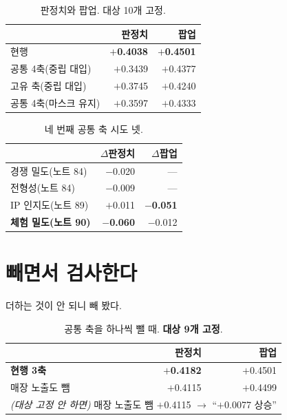 \documentclass[10pt]{article}
\begin{document}
\begin{table}[t]
\centering\tsize
\caption{판정치와 팝업. 대상 10개 고정.}
\begin{tabular}{lrr}
\toprule
& 판정치 & 팝업 \\
\midrule
현행 & \textbf{$+$0.4038} & \textbf{$+$0.4501} \\
공통 4축(중립 대입) & $+$0.3439 & $+$0.4377 \\
고유 축(중립 대입) & $+$0.3745 & $+$0.4240 \\
공통 4축(마스크 유지) & $+$0.3597 & $+$0.4333 \\
\bottomrule
\end{tabular}
\end{table}

\begin{table}[t]
\centering\tsize
\caption{네 번째 공통 축 시도 넷.}
\begin{tabular}{lrr}
\toprule
& $\Delta$판정치 & $\Delta$팝업 \\
\midrule
경쟁 밀도(노트 84) & $-$0.020 & --- \\
전형성(노트 84) & $-$0.009 & --- \\
IP 인지도(노트 89) & $+$0.011 & \textbf{$-$0.051} \\
\textbf{체험 밀도(노트 90)} & \textbf{$-$0.060} & $-$0.012 \\
\bottomrule
\end{tabular}
\end{table}


\section{빼면서 검사한다}

더하는 것이 안 되니 빼 봤다.

\begin{table}[t]
\centering\tsize
\caption{공통 축을 하나씩 뺄 때. \textbf{대상 9개 고정}.}
\begin{tabular}{lrr}
\toprule
& 판정치 & 팝업 \\
\midrule
\textbf{현행 3축} & \textbf{$+$0.4182} & $+$0.4501 \\
매장 노출도 뺌 & $+$0.4115 & $+$0.4499 \\
\midrule
\multicolumn{3}{l}{\emph{(대상 고정 안 하면)} 매장 노출도 뺌 $+$0.4115 $\to$
``$+$0.0077 상승''} \\
\bottomrule
\end{tabular}
\end{table}
\end{document}
